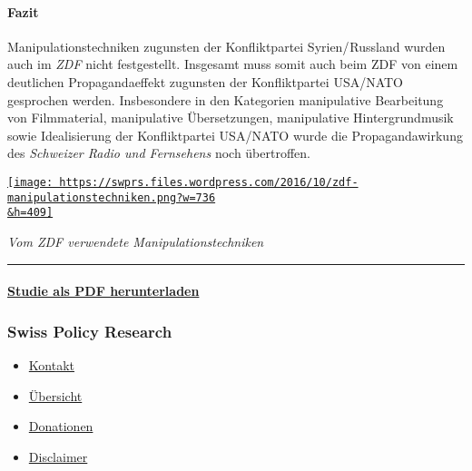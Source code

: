 \hypertarget{fazit}{%
\paragraph{\texorpdfstring{\textbf{Fazit}}{Fazit}}\label{fazit}}

Manipulationstechniken zugunsten der Konfliktpartei Syrien/ Russland
wurden auch im \emph{ZDF} nicht festgestellt. Insgesamt muss somit auch
beim ZDF von einem deutlichen Propagandaeffekt zugunsten der
Konfliktpartei USA/NATO gesprochen werden. Insbesondere in den
Kategorien manipulative Bearbeitung von Filmmaterial, manipulative
Übersetzungen, manipulative Hinter­grund­musik sowie Idealisierung der
Konfliktpartei USA/NATO wurde die Propagandawirkung des \emph{Schweizer
Radio und Fernsehens} noch übertroffen.

\href{https://swprs.files.wordpress.com/2016/10/zdf-manipulationstechniken.png}{\texttt{[image: https://swprs.files.wordpress.com/2016/10/zdf-manipulationstechniken.png?w=736\\\&h=409]}}

\emph{Vom ZDF verwendete Manipulationstechniken}

\begin{center}\rule{0.5\linewidth}{\linethickness}\end{center}

\hypertarget{studie-als-pdf-herunterladen}{%
\paragraph{\texorpdfstring{\href{https://swprs.files.wordpress.com/2017/11/srf-propaganda-analyse-2016-tp.pdf}{Studie
als PDF
herunterladen}}{Studie als PDF herunterladen}}\label{studie-als-pdf-herunterladen}}

\hypertarget{swiss-policy-research}{%
\subsubsection{Swiss Policy Research}\label{swiss-policy-research}}

\begin{itemize}
\tightlist
\item
  \href{https://swprs.org/kontakt/}{Kontakt}
\item
  \href{https://swprs.org/uebersicht/}{Übersicht}
\item
  \href{https://swprs.org/donationen/}{Donationen}
\item
  \href{https://swprs.org/disclaimer/}{Disclaimer}
\end{itemize}

